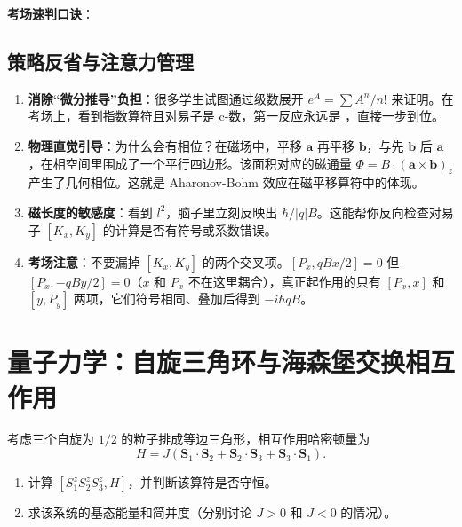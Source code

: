 \textbf{考场速判口诀}：
\begin{center}
\end{center}

\subsection{策略反省与注意力管理}

\begin{enumerate}[nosep]
    \item \textbf{消除``微分推导''负担}：很多学生试图通过级数展开 $e^A = \sum A^n/n!$ 来证明。在考场上，看到指数算符且对易子是 c-数，第一反应永远是 ，直接一步到位。
    \item \textbf{物理直觉引导}：为什么会有相位？在磁场中，平移 $\bm{a}$ 再平移 $\bm{b}$，与先 $\bm{b}$ 后 $\bm{a}$，在相空间里围成了一个平行四边形。该面积对应的磁通量 $\Phi = B \cdot (\bm{a} \times \bm{b})_z$ 产生了几何相位。这就是 Aharonov-Bohm 效应在磁平移算符中的体现。
    \item \textbf{磁长度的敏感度}：看到 $l^2$，脑子里立刻反映出 $\hbar / |q|B$。这能帮你反向检查对易子 $[K_x, K_y]$ 的计算是否有符号或系数错误。
    \item \textbf{考场注意}：不要漏掉 $[K_x, K_y]$ 的两个交叉项。$[P_x, qBx/2] = 0$ 但 $[P_x, -qBy/2] = 0$（$x$ 和 $P_x$ 不在这里耦合），真正起作用的只有 $[P_x, x]$ 和 $[y, P_y]$ 两项，它们符号相同、叠加后得到 $-i\hbar qB$。
\end{enumerate}

\newpage
\section{量子力学：自旋三角环与海森堡交换相互作用}
\label{sec:spin-triangle}

\begin{modelbox}[自旋三角环的守恒量与基态]
考虑三个自旋为 $1/2$ 的粒子排成等边三角形，相互作用哈密顿量为
\[
H = J(\bm{S}_1 \cdot \bm{S}_2 + \bm{S}_2 \cdot \bm{S}_3 + \bm{S}_3 \cdot \bm{S}_1).
\]
\begin{enumerate}[nosep]
    \item 计算 $[S_1^z S_2^z S_3^z, H]$，并判断该算符是否守恒。
    \item 求该系统的基态能量和简并度（分别讨论 $J > 0$ 和 $J < 0$ 的情况）。
\end{enumerate}
\end{modelbox}

